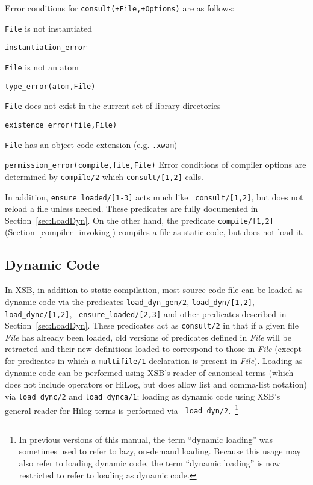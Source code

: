 \begin{description}
Error conditions for {\tt consult(+File,+Options)} are as follows: 
\bi
\item 	{\tt File} is not instantiated
\bi
\item 	{\tt instantiation\_error}
\ei
%
\item 	{\tt File} is not an atom
\bi
\item 	{\tt type\_error(atom,File)}
\ei
\item 	{\tt File} does not exist in the current set of library directories
\bi
\item 	{\tt existence\_error(file,File)}
\ei
%
\item 	{\tt File} has an object code extension (e.g. {\tt .xwam})
\bi
\item 	{\tt permission\_error(compile,file,File)}
\ei
%
\ei
Error conditions of compiler options are determined by {\tt compile/2}
which {\tt consult/[1,2]} calls.
\end{description}

In addition, {\tt ensure\_loaded/[1-3]} acts much like {\tt
  consult/[1,2]}, but does not reload a file unless needed.  These
predicates are fully documented in Section~\ref{sec:LoadDyn}.  On the
other hand, the predicate {\tt compile/[1,2]}
(Section~\ref{compiler_invoking}) compiles a file as static code, but
does not load it.

\subsection{Dynamic Code} \label{sec:dynamic-code}
% 
In XSB, in addition to static compilation, most source code file can
be loaded as dynamic code via the predicates {\tt load\_dyn\_gen/2},
{\tt load\_dyn/[1,2]}, {\tt load\_dync/[1,2]}, {\tt
  ensure\_loaded/[2,3]} and other predicates described in
Section~\ref{sec:LoadDyn}.  These predicates act as {\tt consult/2} in
that if a given file {\em File} has already been loaded, old versions
of predicates defined in {\em File} will be retracted and their new
definitions loaded to correspond to those in {\em File} (except for
predicates in which a {\tt multifile/1} declaration is present in {\em
  File}).  Loading as dynamic code can be performed using XSB's reader
of canonical terms (which does not include operators or HiLog, but
does allow list and comma-list notation) via {\tt load\_dync/2} and
{\tt load\_dynca/1}; loading as dynamic code using XSB's general
reader for Hilog terms is performed via {\tt
  load\_dyn/2}.~\footnote{In previous versions of this manual, the
  term ``dynamic loading'' was sometimes used to refer to lazy,
  on-demand loading.  Because this usage may also refer to loading
  dynamic code, the term ``dynamic loading'' is now restricted to
  refer to loading as dynamic code.}

